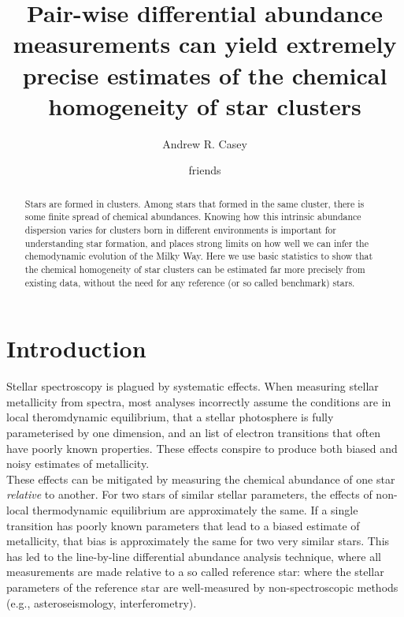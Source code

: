 \documentclass[modern]{aastex631}
\newcommand{\chosentitle}{Pair-wise differential abundance measurements can yield extremely precise estimates of the chemical homogeneity of star clusters}
\begin{document}
\title{\chosentitle}

\author[0000-0003-0174-0564]{Andrew R. Casey}

\author{friends}


\begin{abstract}\noindent
    Stars are formed in clusters. Among stars that formed in the same cluster, there is some finite spread of chemical abundances. Knowing how this intrinsic abundance dispersion varies for clusters born in different environments is important for understanding star formation, and places strong limits on how well we can infer the chemodynamic evolution of the Milky Way. Here we use basic statistics to show that the chemical homogeneity of star clusters can be estimated far more precisely from existing data, without the need for any reference (or so called benchmark) stars.
\end{abstract}



\section{Introduction} \label{sec:introduction}
Stellar spectroscopy is plagued by systematic effects. When measuring stellar metallicity from spectra, most analyses incorrectly assume the conditions are in local theromdynamic equilibrium, that a stellar photosphere is fully parameterised by one dimension, and an list of electron transitions that often have poorly known properties. These effects conspire to produce both biased and noisy estimates of metallicity.\\

These effects can be mitigated by measuring the chemical abundance of one star \emph{relative} to another. For two stars of similar stellar parameters, the effects of non-local thermodynamic equilibrium are approximately the same. If a single transition has poorly known parameters that lead to a biased estimate of metallicity, that bias is approximately the same for two very similar stars. This has led to the line-by-line differential abundance analysis technique, where all measurements are made relative to a so called reference star: where the stellar parameters of the reference star are well-measured by non-spectroscopic methods (e.g., asteroseismology, interferometry).\\
\end{document}
